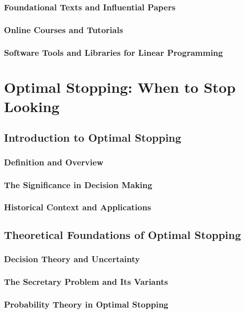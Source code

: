 \documentclass[12pt]{book} %
\begin{document}
\subsection{Foundational Texts and Influential Papers}
\subsection{Online Courses and Tutorials}
\subsection{Software Tools and Libraries for Linear Programming}

\chapter{Optimal Stopping: When to Stop Looking}

\section{Introduction to Optimal Stopping}
\subsection{Definition and Overview}
\subsection{The Significance in Decision Making}
\subsection{Historical Context and Applications}

\section{Theoretical Foundations of Optimal Stopping}
\subsection{Decision Theory and Uncertainty}
\subsection{The Secretary Problem and Its Variants}
\subsection{Probability Theory in Optimal Stopping}
\end{document}
